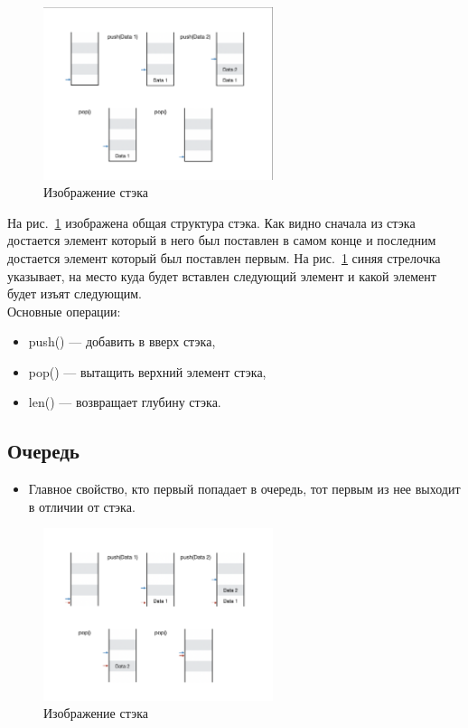 \begin{figure}[h!t]\center
\includegraphics[width=0.6\textwidth]{section/section4_2.jpg}
\caption{Изображение стэка}
\label{Lecture_4_Stek}
\end{figure}

На рис.~\ref{Lecture_4_Stek} изображена общая структура стэка. Как видно сначала из стэка достается элемент который в него был поставлен в самом конце и последним достается элемент который был поставлен первым. На рис.~\ref{Lecture_4_Stek}  синяя стрелочка указывает, на место куда будет вставлен следующий элемент и какой элемент будет изъят следующим.\\

Основные операции:
\begin{itemize}
	\item push() --- добавить в вверх стэка,
	\item pop()  --- вытащить верхний элемент стэка,
	\item len() --- возвращает глубину стэка.
\end{itemize}

\subsection{Очередь}
\begin{itemize}
	\item Главное свойство, кто первый попадает в очередь, тот первым из нее выходит в отличии от стэка.
\end{itemize}


\begin{figure}[h!t]\center
\includegraphics[width=0.6\textwidth]{section/section4_3.jpg}
\caption{Изображение стэка}
\label{Lecture_4_Queue}
\end{figure}

